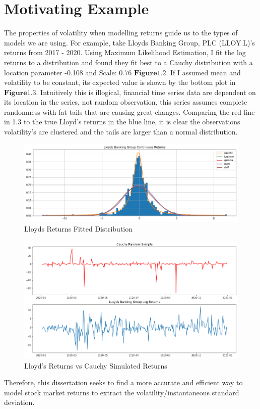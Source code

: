 \section{Motivating Example}
The properties of volatility when modelling returns guide us to the types of models we are using. For example, take Lloyds Banking Group, PLC (LLOY.L)'s returns from 2017 - 2020. Using Maximum Likelihood Estimation, I fit the log returns to a distribution and found they fit best to a Cauchy distribution with a location parameter -0.108 and Scale: 0.76 $\mathbf{Figure 1.2}$. If I assumed mean and volatility to be constant, its expected value is shown by the bottom plot in $\mathbf{Figure 1.3}$. Intuitively this is illogical, financial time series data are dependent on its location in the series, not random observation, this series assumes complete randomness with fat tails that are causing great changes. Comparing the red line in 1.3 to the true Lloyd's returns in the blue line, it is clear the observations volatility's are clustered and the tails are larger than a normal distribution. 
\begin{figure}[H]
\centering
\includegraphics[scale=0.45]{images/LLoyReturnsDistribution.png}
\caption{Lloyds Returns Fitted Distribution}
\label{fig: LLOY Fitted Distribution}
\end{figure}
\begin{figure}[H]
\centering
\includegraphics[scale=0.45]{images/LLOYvsCauchy.png}
\caption{Lloyd's Returns vs Cauchy Simulated Returns}
\label{fig: Returns v Cauchy}
\end{figure}
Therefore, this dissertation seeks to find a more accurate and efficient way to model stock market returns to extract the volatility/instantaneous standard deviation.  
